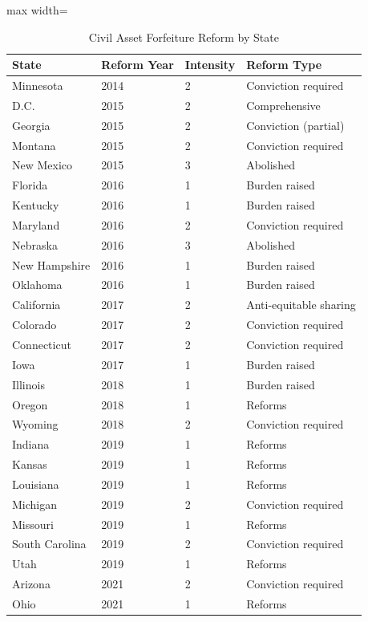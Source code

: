 \documentclass[12pt]{article}
\begin{document}
\begin{table}[H]
\centering
\caption{Civil Asset Forfeiture Reform by State}
\label{tab:reforms}
\begin{adjustbox}{max width=\textwidth}
\begin{tabular}{llll}
\toprule
State & Reform Year & Intensity & Reform Type \\
\midrule
Minnesota & 2014 & 2 & Conviction required \\
D.C. & 2015 & 2 & Comprehensive \\
Georgia & 2015 & 2 & Conviction (partial) \\
Montana & 2015 & 2 & Conviction required \\
New Mexico & 2015 & 3 & Abolished \\
Florida & 2016 & 1 & Burden raised \\
Kentucky & 2016 & 1 & Burden raised \\
Maryland & 2016 & 2 & Conviction required \\
Nebraska & 2016 & 3 & Abolished \\
New Hampshire & 2016 & 1 & Burden raised \\
Oklahoma & 2016 & 1 & Burden raised \\
California & 2017 & 2 & Anti-equitable sharing \\
Colorado & 2017 & 2 & Conviction required \\
Connecticut & 2017 & 2 & Conviction required \\
Iowa & 2017 & 1 & Burden raised \\
Illinois & 2018 & 1 & Burden raised \\
Oregon & 2018 & 1 & Reforms \\
Wyoming & 2018 & 2 & Conviction required \\
Indiana & 2019 & 1 & Reforms \\
Kansas & 2019 & 1 & Reforms \\
Louisiana & 2019 & 1 & Reforms \\
Michigan & 2019 & 2 & Conviction required \\
Missouri & 2019 & 1 & Reforms \\
South Carolina & 2019 & 2 & Conviction required \\
Utah & 2019 & 1 & Reforms \\
Arizona & 2021 & 2 & Conviction required \\
Ohio & 2021 & 1 & Reforms \\
\bottomrule
\end{tabular}
\end{adjustbox}
\end{table}
\end{document}
